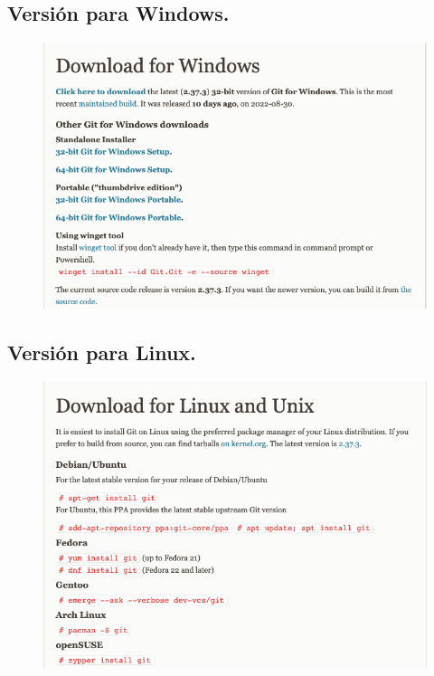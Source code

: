 \subsection*{Versión para Windows.}

\begin{figure}[H]
    \centering
    \includegraphics[scale=0.35]{Imagenes/git_03.png}
\end{figure}

\subsection*{Versión para Linux.}

\begin{figure}[H]
    \centering
    \includegraphics[scale=0.35]{Imagenes/git_04.png}
\end{figure}

